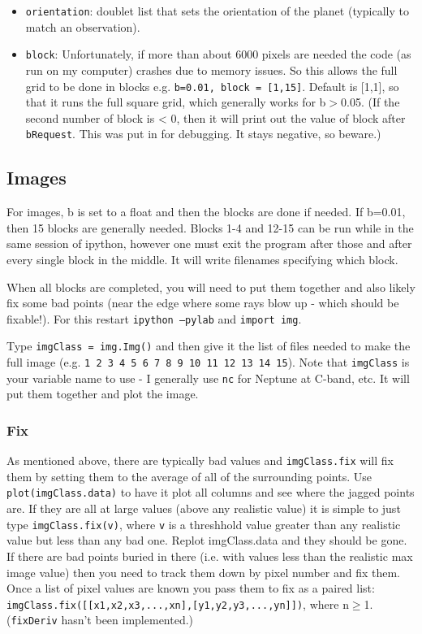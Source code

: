 \documentclass[11pt]{article}
\begin{document}
\begin{itemize}
\item \texttt{orientation}:  doublet list that sets the orientation of the planet (typically to match an observation).
\item \texttt{block}:  Unfortunately, if more than about 6000 pixels are needed the code (as run on my computer) crashes due to memory issues.  So this allows the full grid to be done in blocks e.g. \texttt{b=0.01, block = [1,15]}.  Default is [1,1], so that it runs the full square grid, which generally works for b$>$0.05.  (If the second number of block is < 0, then it
will print out the value of block after \texttt{bRequest}.  This was put in for debugging.  It stays negative, so beware.)
\end{itemize}

\subsection{Images}
For images, b is set to a float and then the blocks are done if needed.  If b=0.01, then 15 blocks are generally needed.  Blocks 1-4 and 12-15 can be run while in the same session of ipython, however one must exit the program after those and after every single block in the middle.  It will write filenames specifying which block.

When all blocks are completed, you will need to put them together and also likely fix some bad points (near the edge where some rays blow up - which should be fixable!).  For this restart \texttt{ipython --pylab} and \texttt{import img}.

Type \texttt{imgClass = img.Img()} and then give it the list of files needed to make the full image (e.g. \texttt{1 2 3 4 5 6 7 8 9 10 11 12 13 14 15}). Note that \texttt{imgClass} is your variable name to use - I generally use \texttt{nc} for Neptune at C-band, etc.  It will put them together and plot the image.    

\subsubsection{Fix}
As mentioned above, there are typically bad values and \texttt{imgClass.fix} will fix them by setting them to the average of all of the surrounding points.
Use \texttt{plot(imgClass.data)} to have it plot all columns and see where the jagged points are.  If they are all at large values (above any realistic value) it is simple to just type \texttt{imgClass.fix(v)}, where \texttt{v} is a threshhold value greater than any realistic value but less than any bad one.  Replot imgClass.data and they should be gone.  If there are bad points buried in there (i.e. with values less than the realistic max image value) then you need to track them down by pixel number and fix them.  Once a list of pixel values are known you pass them to fix as a paired list:  \texttt{imgClass.fix([[x1,x2,x3,...,xn],[y1,y2,y3,...,yn]])}, where n$\ge$1.  
(\texttt{fixDeriv} hasn't been implemented.)
\end{document}
